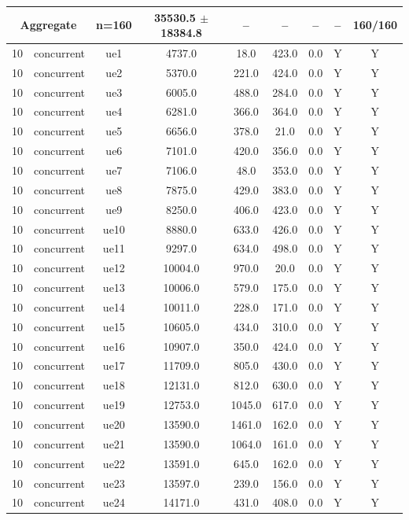 \begin{table}[ht]
\begin{tabular}{|c|c|c|c|c|c|c|c|c|}
\multicolumn{2}{|c|}{\textbf{Aggregate}} & n=160 & 35530.5 $\pm$ 18384.8 & -- & -- & -- & -- & 160/160 \\
\hline
10 & concurrent & ue1 & 4737.0 & 18.0 & 423.0 & 0.0 & Y & Y \\
10 & concurrent & ue2 & 5370.0 & 221.0 & 424.0 & 0.0 & Y & Y \\
10 & concurrent & ue3 & 6005.0 & 488.0 & 284.0 & 0.0 & Y & Y \\
10 & concurrent & ue4 & 6281.0 & 366.0 & 364.0 & 0.0 & Y & Y \\
10 & concurrent & ue5 & 6656.0 & 378.0 & 21.0 & 0.0 & Y & Y \\
10 & concurrent & ue6 & 7101.0 & 420.0 & 356.0 & 0.0 & Y & Y \\
10 & concurrent & ue7 & 7106.0 & 48.0 & 353.0 & 0.0 & Y & Y \\
10 & concurrent & ue8 & 7875.0 & 429.0 & 383.0 & 0.0 & Y & Y \\
10 & concurrent & ue9 & 8250.0 & 406.0 & 423.0 & 0.0 & Y & Y \\
10 & concurrent & ue10 & 8880.0 & 633.0 & 426.0 & 0.0 & Y & Y \\
10 & concurrent & ue11 & 9297.0 & 634.0 & 498.0 & 0.0 & Y & Y \\
10 & concurrent & ue12 & 10004.0 & 970.0 & 20.0 & 0.0 & Y & Y \\
10 & concurrent & ue13 & 10006.0 & 579.0 & 175.0 & 0.0 & Y & Y \\
10 & concurrent & ue14 & 10011.0 & 228.0 & 171.0 & 0.0 & Y & Y \\
10 & concurrent & ue15 & 10605.0 & 434.0 & 310.0 & 0.0 & Y & Y \\
10 & concurrent & ue16 & 10907.0 & 350.0 & 424.0 & 0.0 & Y & Y \\
10 & concurrent & ue17 & 11709.0 & 805.0 & 430.0 & 0.0 & Y & Y \\
10 & concurrent & ue18 & 12131.0 & 812.0 & 630.0 & 0.0 & Y & Y \\
10 & concurrent & ue19 & 12753.0 & 1045.0 & 617.0 & 0.0 & Y & Y \\
10 & concurrent & ue20 & 13590.0 & 1461.0 & 162.0 & 0.0 & Y & Y \\
10 & concurrent & ue21 & 13590.0 & 1064.0 & 161.0 & 0.0 & Y & Y \\
10 & concurrent & ue22 & 13591.0 & 645.0 & 162.0 & 0.0 & Y & Y \\
10 & concurrent & ue23 & 13597.0 & 239.0 & 156.0 & 0.0 & Y & Y \\
10 & concurrent & ue24 & 14171.0 & 431.0 & 408.0 & 0.0 & Y & Y \\

\end{tabular}
\end{table}
